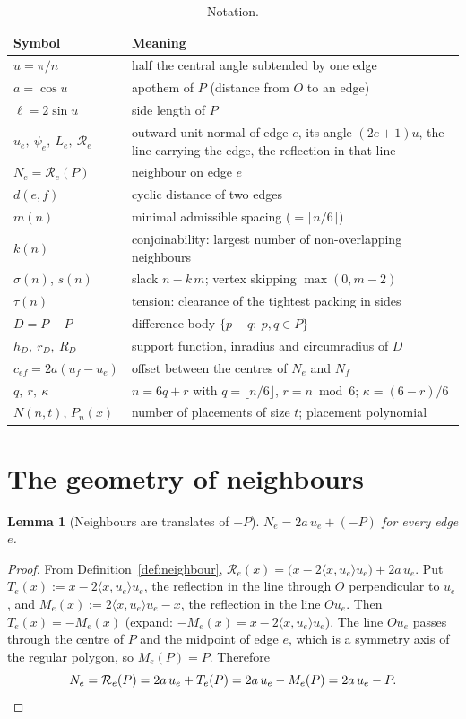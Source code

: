 \documentclass[11pt,a4paper]{article}
\newtheorem{lemma}[theorem]{Lemma}
\theoremstyle{definition}
\theoremstyle{remark}
\newcommand{\ip}[2]{\langle #1,#2\rangle}
\newcommand{\Rf}{\mathcal{R}}
\begin{document}
\begin{table}[ht]
\centering\small
\begin{tabular}{@{}p{2.4cm}p{12.6cm}@{}}
\toprule
Symbol & Meaning\\
\midrule
$u=\pi/n$ & half the central angle subtended by one edge\\
$a=\cos u$ & apothem of $P$ (distance from $O$ to an edge)\\
$\ell=2\sin u$ & side length of $P$\\
$u_e,\ \psi_e,\ L_e,\ \Rf_e$ & outward unit normal of edge $e$, its angle $(2e+1)u$, the line carrying the edge, the reflection in that line\\
$N_e=\Rf_e(P)$ & neighbour on edge $e$\\
$d(e,f)$ & cyclic distance of two edges\\
$m(n)$ & minimal admissible spacing ($=\lceil n/6\rceil$)\\
$k(n)$ & conjoinability: largest number of non-overlapping neighbours\\
$\sigma(n)$, $s(n)$ & slack $n-k\,m$; vertex skipping $\max(0,m-2)$\\
$\tau(n)$ & tension: clearance of the tightest packing in sides\\
$D=P-P$ & difference body $\{p-q:\ p,q\in P\}$\\
$h_D,\ r_D,\ R_D$ & support function, inradius and circumradius of $D$\\
$c_{ef}=2a(u_f-u_e)$ & offset between the centres of $N_e$ and $N_f$\\
$q,\ r,\ \kappa$ & $n=6q+r$ with $q=\lfloor n/6\rfloor$, $r=n\bmod6$; $\kappa=(6-r)/6$\\
$N(n,t)$, $P_n(x)$ & number of placements of size $t$; placement polynomial\\
\bottomrule
\end{tabular}
\caption{Notation.}
\end{table}

\section{The geometry of neighbours}\label{sec:geometry}

\begin{lemma}[Neighbours are translates of $-P$]\label{lem:translate}
$N_e=2a\,u_e+(-P)$ for every edge $e$.
\end{lemma}
\begin{proof}
From Definition~\ref{def:neighbour}, $\Rf_e(x)=\big(x-2\ip{x}{u_e}u_e\big)+2a\,u_e$. Put $T_e(x):=x-2\ip{x}{u_e}u_e$, the reflection in the line through $O$ perpendicular to $u_e$,
and $M_e(x):=2\ip{x}{u_e}u_e-x$, the reflection in the line $Ou_e$. Then $T_e(x)=-M_e(x)$ (expand: $-M_e(x)=x-2\ip{x}{u_e}u_e$).
The line $Ou_e$ passes through the centre of $P$ and the midpoint of edge $e$, which is a symmetry axis of the regular polygon, so $M_e(P)=P$. Therefore
\[
N_e=\Rf_e(P)=2a\,u_e+T_e(P)=2a\,u_e-M_e(P)=2a\,u_e-P. \qedhere
\]
\end{proof}
\end{document}
